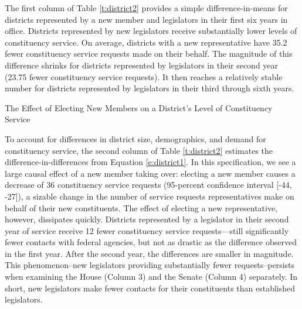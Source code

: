 \documentclass[12pt]{article}
\begin{document}
The first column of Table \ref{t:district2} provides a simple difference-in-means for districts represented by a new member and legislators in their first six years in office. Districts represented by new legislators receive substantially lower levels of constituency service. On average, districts with a new representative have 35.2 fewer constituency service requests made on their behalf. The magnitude of this difference shrinks for districts represented by legislators in their second year (23.75 fewer constituency service requests). It then reaches a relatively stable number for districts represented by legislators in their third through sixth years. %



\begin{table}[hbt!]
\caption{The Effect of Electing New Members on a District's Level of Constituency Service} \label{t:district2}
\begin{minipage}{\textwidth}
\begin{center}

\end{center}
\end{minipage}
\end{table}


To account for differences in district size, demographics, and demand for constituency service, the second column of Table \ref{t:district2} estimates the difference-in-differences from Equation \ref{e:district1}. In this specification, we see a large causal effect of a new member taking over: electing a new member causes a decrease of 36 constituency service requests (95-percent confidence interval [-44, -27]), a sizable change in the number of service requests representatives make on behalf of their new constituents. %
The effect of electing a new representative, however, dissipates quickly. Districts represented by a legislator in their second year of service receive 12 fewer constituency service requests---still significantly fewer contacts with federal agencies, but not as drastic as the difference observed in the first year. After the second year, the differences are smaller in magnitude. This phenomenon--new legislators providing substantially fewer requests--persists when examining the House (Column 3) and the Senate (Column 4) separately. In short, new legislators make fewer contacts for their constituents than established legislators.  
\end{document}
